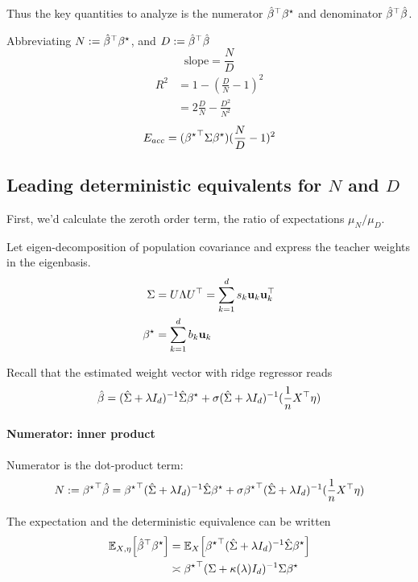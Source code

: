 Thus the key quantities to analyze is the numerator ${\hat{\beta}}^{\top}{\beta^{\star}}$
and denominator ${\hat{\beta}}^{\top}\hat{\beta}$.

Abbreviating $N:={\hat{\beta}}^{\top}{\beta^{\star}}$, and $D:={\hat{\beta}}^{\top}\hat{\beta}$
\[
\mathrm{slope}=\frac{N}{D}
\]
\begin{align*}
R^{2} & =1-(\frac{D}{N}-1)^{2}\\
 & =2\frac{D}{N}-\frac{D^{2}}{N^{2}}
\end{align*}
\[
E_{acc}=({{\beta^{\star}}}^{\top}\Sigma{\beta^{\star}})(\frac{N}{D}-1)^{2}
\]




\subsection{Leading deterministic equivalents for $N$ and $D$}

First, we'd calculate the zeroth order term, the ratio of expectations
$\mu_{N}/\mu_{D}$.

Let eigen-decomposition of population covariance and express the teacher
weights in the eigenbasis.
\begin{align*}
\Sigma & =U\Lambda U^{\top}=\sum_{k=1}^{d}s_{k}\mathbf{u}_{k}\mathbf{u}_{k}^{\top}\\
{\beta^{\star}} & =\sum_{k=1}^{d}b_{k}\mathbf{u}_{k}
\end{align*}

Recall that the estimated weight vector with ridge regressor reads
\[
\hat{\beta}=(\hat{\Sigma}+\lambda I_{d})^{-1}\hat{\Sigma}{\beta^{\star}}+\sigma(\hat{\Sigma}+\lambda I_{d})^{-1}(\frac{1}{n}X^{\top}\eta)
\]


\paragraph{Numerator: inner product}

Numerator is the dot-product term:
\[
N:={{\beta^{\star}}}^{\top}\hat{\beta}={{\beta^{\star}}}^{\top}(\hat{\Sigma}+\lambda I_{d})^{-1}\hat{\Sigma}{\beta^{\star}}+\sigma{{\beta^{\star}}}^{\top}(\hat{\Sigma}+\lambda I_{d})^{-1}(\frac{1}{n}X^{\top}\eta)
\]

The expectation and the deterministic equivalence can be written
\begin{align*}
\mathbb{E}_{X,\eta}\Big[{\hat{\beta}}^{\top}{\beta^{\star}}\Big] & =\mathbb{E}_{X}\Big[{{\beta^{\star}}}^{\top}(\hat{\Sigma}+\lambda I_{d})^{-1}\hat{\Sigma}{\beta^{\star}}\Big]\\
 & \asymp{{\beta^{\star}}}^{\top}(\Sigma+\kappa(\lambda)I_{d})^{-1}\Sigma{\beta^{\star}}
\end{align*}

